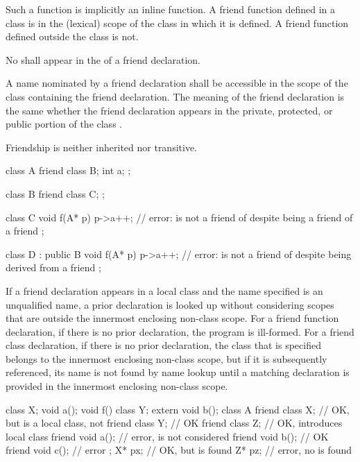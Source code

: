 \pnum
Such a function is implicitly an inline function.
A friend
function defined in a class is in the (lexical) scope of the class in which it is defined.
A friend function defined outside the class is not.

\pnum
No
shall appear in the
of a friend declaration.

\pnum
{}%
A name nominated by a friend declaration shall be accessible in the scope of the
class containing the friend declaration.
The meaning of the friend declaration is the same whether the friend declaration
appears in the private, protected, or public
portion of the class
.

\pnum
{}%
Friendship is neither inherited nor transitive.
\begin{example}
\begin{codeblock}
class A {
  friend class B;
  int a;
};

class B {
  friend class C;
};

class C  {
  void f(A* p) {
    p->a++;         // error:  is not a friend of  despite being a friend of a friend
  }
};

class D : public B  {
  void f(A* p) {
    p->a++;         // error:  is not a friend of  despite being derived from a friend
  }
};
\end{codeblock}
\end{example}

\pnum
{}%
%
If a friend declaration appears in a local class and the
name specified is an unqualified name, a prior declaration is looked
up without considering scopes that are outside the innermost enclosing
non-class scope.
For a friend function declaration, if there is no
prior declaration, the program is ill-formed.
For a friend class
declaration, if there is no prior declaration, the class that is
specified belongs to the innermost enclosing non-class scope, but if it is
subsequently referenced, its name is not found by name lookup
until a matching declaration is provided in the innermost enclosing
non-class scope.
\begin{example}
\begin{codeblock}
class X;
void a();
void f() {
  class Y;
  extern void b();
  class A {
  friend class X;   // OK, but  is a local class, not 
  friend class Y;   // OK
  friend class Z;   // OK, introduces local class 
  friend void a();  // error,  is not considered
  friend void b();  // OK
  friend void c();  // error
  };
  X* px;            // OK, but  is found
  Z* pz;            // error, no  is found
}
\end{codeblock}
\end{example}

